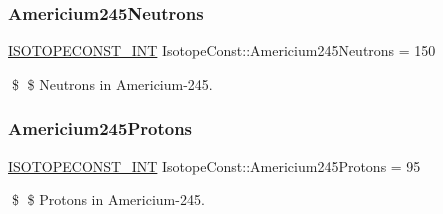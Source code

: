 \subsubsection{\texorpdfstring{Americium245\+Neutrons}{Americium245Neutrons}}
{\footnotesize\ttfamily \mbox{\hyperlink{group___isotope_const-_macros_ga5f18360b3e99483a35c32d789e62621c}{I\+S\+O\+T\+O\+P\+E\+C\+O\+N\+S\+T\+\_\+\+I\+NT}} Isotope\+Const\+::\+Americium245\+Neutrons = 150}

\$ \$ Neutrons in Americium-\/245. \mbox{\label{group___isotope_const-_americium-_am245_ga694c998baccdafc26d2e846f87a67091}} 
\subsubsection{\texorpdfstring{Americium245\+Protons}{Americium245Protons}}
{\footnotesize\ttfamily \mbox{\hyperlink{group___isotope_const-_macros_ga5f18360b3e99483a35c32d789e62621c}{I\+S\+O\+T\+O\+P\+E\+C\+O\+N\+S\+T\+\_\+\+I\+NT}} Isotope\+Const\+::\+Americium245\+Protons = 95}

\$ \$ Protons in Americium-\/245. 